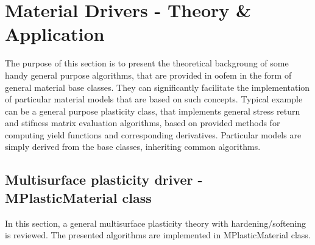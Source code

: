 \documentclass[a4paper]{article}
\begin{document}
\section{Material Drivers - Theory \& Application}
The purpose of this section is to present the theoretical backgroung
of some handy general purpose algorithms, that are provided in oofem in the
form of general material base classes. They can significantly
facilitate the implementation of particular material models that are
based on such concepts. Typical example can be a general purpose
plasticity class, that implements general stress return and stifness
matrix evaluation algorithms, based on provided methods for computing
yield functions and corresponding derivatives. Particular
models are simply derived from the base classes, inheriting
common algorithms.



\subsection{Multisurface plasticity driver - MPlasticMaterial class}

In this section, a general multisurface plasticity theory with
hardening/softening is reviewed. The presented algorithms are
implemented in MPlasticMaterial class.
\end{document}

